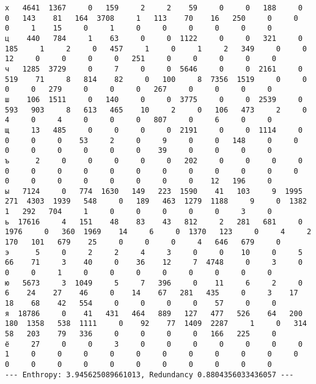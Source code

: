 \documentclass{article}
\begin{document}
\begin{landscape}
\begin{addmargin}{0em}
\begin{verbatim}
х   4641  1367     0   159     2     2    59     0     0   188     0     0   143    81   164  3708     1   113    70    16   250     0     0     0     1    15     0     1     0     0     0     0     0     0
ц    440   784     1    63     0     0  1122     0     0   321     0   185     1     2     0   457     1     0     1     2   349     0     0    12     0     0     0     0   251     0     0     0     0     0
ч   1285  3729     0     7     0     0  5646     0     0  2161     0   519    71     8   814    82     0   100     8  7356  1519     0     0     0     0   279     0     0     0   267     0     0     0     0
ш    106  1511     0   140     0     0  3775     0     0  2539     0   593   903     8   613   465    10     2     0   106   473     2     0     4     0     4     0     0     0   807     0     6     0     0
щ     13   485     0     0     0     0  2191     0     0  1114     0     0     0     0    53     2     0     9     0     0   148     0     0     0     0     0     0     0     0    39     0     0     0     0
ъ      2     0     0     0     0     0   202     0     0     0     0     0     0     0     0     0     0     0     0     0     0     0     0     0     0     0     0     0     0     0     0    12   196     0
ы   7124     0   774  1630   149   223  1590    41   103     9  1995   271  4303  1939   548     0   189   463  1279  1188     9     0  1382     1   292   704     1     0     0     0     0     0     3     0
ь  17616     4   151    48    83    43   812     2   281   681     0  1976     0   360  1969    14     6     0  1370   123     0     4     2   170   101   679    25     0     0     0     4   646   679     0
э      5     0     2     2     4     3     0     0    10     0     5    66    71     3    40     0    36    12     7  4748     0     3     0     0     0     1     0     0     0     0     0     0     0     0
ю   5673     3  1049     5     7   396     0    11     6     2     0     6    24    27    46     0    14    67   281   435     0     3    17    18    68    42   554     0     0     0     0    57     0     0
я  18786     0    41   431   464   889   127   477   526    64   200   180  1358   538  1111     0    92    77  1409  2287     1     0   314    58   203    79   336     0     0     0     0   166   225     0
ё     27     0     0     3     0     0     0     0     0     0     0     1     0     0     0     0     0     0     0     0     0     0     0     0     0     0     0     0     0     0     0     0     0     0
--- Enthropy: 3.945625089661013, Redundancy 0.8804356033436057 ---

		\end{verbatim}
	\end{addmargin}
\vspace{-2em}

\end{landscape}
\end{document}
